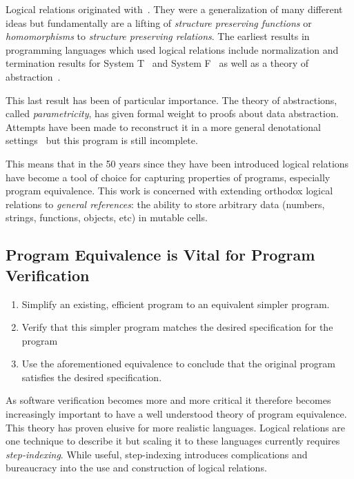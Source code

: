 \documentclass[a0,landscape]{a0poster}
\begin{document}
\begin{multicols}{4}
  Logical relations originated with~\citet{Tait:67}. They were a
  generalization of many different ideas but fundamentally are a
  lifting of \emph{structure preserving functions} or
  \emph{homomorphisms} to \emph{structure preserving relations}.  The
  earliest results in programming languages which used logical
  relations include normalization and termination results for System
  T~\citep{Tait:67} and System F~\citep{Girard:72} as well as a theory
  of abstraction~\citep{Reynolds:83}.

  This last result has been of particular importance. The theory of
  abstractions, called \emph{parametricity}, has given formal weight
  to proofs about data abstraction. Attempts have been made to
  reconstruct it in a more general denotational
  settings~\citep{Bainbridge:90,Abadi:90,Ma:91,Birkedal:05,Dunphy:04}
  but this program is still incomplete.

  This means that in the 50 years since they have been introduced
  logical relations have become a tool of choice for capturing
  properties of programs, especially program equivalence. This work is
  concerned with extending orthodox logical relations to \emph{general
    references}: the ability to store arbitrary data (numbers,
  strings, functions, objects, etc) in mutable cells.

  \subsection*{Program Equivalence is Vital for Program Verification}
  \begin{enumerate}
  \item Simplify an existing, efficient program to an equivalent
    simpler program.
  \item Verify that this simpler program matches the desired
    specification for the program
  \item Use the aforementioned equivalence to conclude that the
    original program satisfies the desired specification.
  \end{enumerate}
  As software verification becomes more and more critical it therefore
  becomes increasingly important to have a well understood theory of
  program equivalence. This theory has proven elusive for more
  realistic languages. Logical relations are one technique to describe
  it but scaling it to these languages currently requires
  \emph{step-indexing}. While useful, step-indexing introduces
  complications and bureaucracy into the use and construction of
  logical relations.


\end{multicols}
\end{document}
